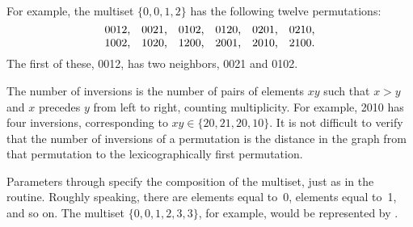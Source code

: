 For example, the multiset $\{0,0,1,2\}$ has the following twelve permutations:
$$\vcenter{\halign{#&&\quad#\cr
0012,&0021,&0102,&0120,&0201,&0210,\cr
1002,&1020,&1200,&2001,&2010,&2100.\cr}}$$
The first of these, 0012, has two neighbors, 0021 and 0102.

The number of inversions is the number of pairs of elements $xy$ such
that $x>y$ and $x$ precedes $y$ from left to right, counting
multiplicity.  For example, 2010 has four inversions, corresponding to
$xy\in\{20,21,20,10\}$. It is not difficult to verify that the number
of inversions of a permutation is the distance in the graph from that
permutation to the lexicographically first permutation.

Parameters  through  specify the composition of the
multiset,
just as in the  routine.
Roughly speaking, there are  elements equal to~0, 
elements
equal to~1, and so on. The multiset $\{0,0,1,2,3,3\}$, for example, would
be represented by .


